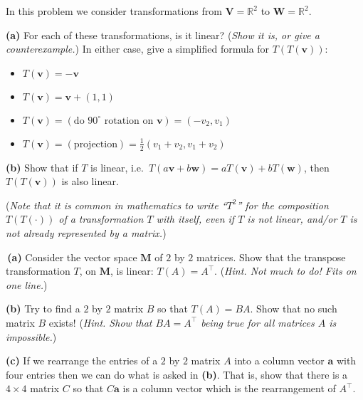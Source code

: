 \documentclass[12pt]{amsart}
\newcommand{\ba}{\bm{a}}
\newcommand{\bv}{\bm{v}}
\newcommand{\bw}{\bm{w}}
\newcommand{\bM}{\bm{M}}
\newcommand{\bV}{\bm{V}}
\newcommand{\bW}{\bm{W}}
\newcommand{\RR}{\mathbb{R}}
\newcommand{\prob}[1]{\bigskip\noindent{\large \textbf{#1.}}\quad }
\newcommand{\epart}[1]{\medskip\noindent\textbf{(#1)}\quad }
\newcommand{\ppart}[1]{\,\textbf{(#1)}\quad }
\begin{document}
\prob{P60}  In this problem we consider transformations from $\bV=\RR^2$ to $\bW=\RR^2$.

\epart{a} For each of these transformations, is it linear?  (\emph{Show it is, or give a counterexample.})  In either case, give a simplified formula for $T(T(\bv))$:
\begin{itemize}
\item $T(\bv) = -\bv$
\item $T(\bv) = \bv + (1,1)$
\item $T(\bv) = \left(\text{do $90^\circ$ rotation on $\bv$}\right) = (-v_2,v_1)$
\item $T(\bv) = (\text{projection}) = \frac{1}{2} (v_1+v_2,v_1+v_2)$
\end{itemize}

\epart{b} Show that if $T$ is linear, i.e.~$T(a\bv+b\bw)=a T(\bv) + b T(\bw)$, then $T(T(\bv))$ is also linear.

\medskip
\noindent (\emph{Note that it is common in mathematics to write ``$T^2$'' for the composition $T(T(\cdot))$ of a transformation $T$ with itself, even if $T$ is not linear, and/or $T$ is not already represented by a matrix.})


\prob{P61}  \ppart{a} Consider the vector space $\bM$ of $2$ by $2$ matrices.  Show that the transpose transformation $T$, on $\bM$, is linear: $T(A) = A^\top$.  (\emph{Hint.  Not much to do!  Fits on one line.})

\epart{b}  Try to find a $2$ by $2$ matrix $B$ so that $T(A) = B A$.  Show that no such matrix $B$ exists!  (\emph{Hint.  Show that $BA=A^\top$ being true for \emph{all} matrices $A$ is impossible.})

\epart{c}  If we rearrange the entries of a $2$ by $2$ matrix $A$ into a column vector $\ba$ with four entries then we can do what is asked in \textbf{(b)}.  That is, show that there is a $4\times 4$ matrix $C$ so that $C \ba$ is a column vector which is the rearrangement of $A^\top$.
\end{document}
